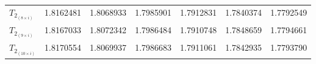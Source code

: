 \begin{table*}[t!]
\begin{tabular}{l*{6}{c}}
        $T_{2_{(8 \times i)}}$ & 1.8162481 & 1.8068933          & 1.7985901          & 1.7912831 & 1.7840374 & 1.7792549                  \\[+0.5ex]
        $T_{2_{(9 \times i)}}$ & 1.8167033 & 1.8072342          & 1.7986484          & 1.7910748 & 1.7848659 & 1.7794661                  \\[+0.5ex]
        $T_{2_{(10\times i)}}$ & 1.8170554 & 1.8069937          & 1.7986683          & 1.7911061 & 1.7842935 & 1.7793790                  \\[+0.5ex]
        \hline
    \end{tabular}
\end{table*}
